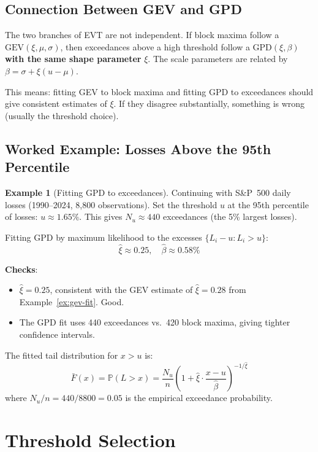 \documentclass[11pt, a4paper]{article}
\theoremstyle{definition}
\newtheorem{example}{Example}[section]
\theoremstyle{plain}
\theoremstyle{remark}
\newcommand{\PV}{\mathbb{P}}
\begin{document}
\subsection{Connection Between GEV and GPD}

The two branches of EVT are not independent.
If block maxima follow a $\text{GEV}(\xi, \mu, \sigma)$, then exceedances above a high threshold
follow a $\text{GPD}(\xi, \beta)$ \textbf{with the same shape parameter} $\xi$.
The scale parameters are related by $\beta = \sigma + \xi(u - \mu)$.

This means: fitting GEV to block maxima and fitting GPD to exceedances
should give consistent estimates of $\xi$.
If they disagree substantially, something is wrong (usually the threshold choice).

\subsection{Worked Example: Losses Above the 95th Percentile}

\begin{example}[Fitting GPD to exceedances]\label{ex:gpd-fit}
Continuing with S\&P~500 daily losses (1990--2024, 8{,}800 observations).
Set the threshold $u$ at the 95th percentile of losses: $u \approx 1.65\%$.
This gives $N_u \approx 440$ exceedances (the 5\% largest losses).

Fitting GPD by maximum likelihood to the excesses $\{L_i - u : L_i > u\}$:
\[
    \hat\xi \approx 0.25, \quad \hat\beta \approx 0.58\%
\]

\textbf{Checks}:
\begin{itemize}
    \item $\hat\xi = 0.25$, consistent with the GEV estimate of $\hat\xi = 0.28$ from Example~\ref{ex:gev-fit}. Good.
    \item The GPD fit uses 440 exceedances vs.\ 420 block maxima, giving tighter confidence intervals.
\end{itemize}

The fitted tail distribution for $x > u$ is:
\[
    \bar{F}(x) = \PV(L > x) = \frac{N_u}{n}\left(1 + \hat\xi \cdot \frac{x - u}{\hat\beta}\right)^{-1/\hat\xi}
\]
where $N_u / n = 440 / 8800 = 0.05$ is the empirical exceedance probability.
\end{example}

\section{Threshold Selection}
\label{sec:threshold}
\end{document}
